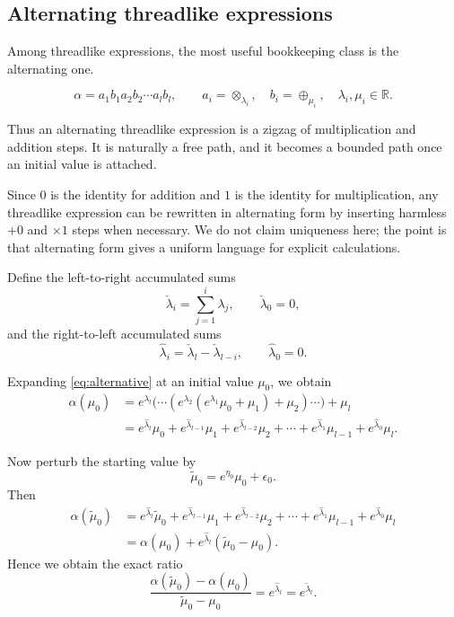 \subsection{Alternating threadlike expressions}\label{subsec:alternating}

Among threadlike expressions, the most useful bookkeeping class is the alternating one.

\begin{equation}\label{eq:alternative}
\alpha = a_1 b_1 a_2 b_2 \cdots a_l b_l,
\qquad
 a_i=\otimes_{\lambda_i},\quad b_i=\oplus_{\mu_i},\quad \lambda_i,\mu_i\in\mathbb{R}.
\end{equation}

Thus an alternating threadlike expression is a zigzag of multiplication and addition steps. It is naturally a free path, and it becomes a bounded path once an initial value is attached.

Since $0$ is the identity for addition and $1$ is the identity for multiplication, any threadlike expression can be rewritten in alternating form by inserting harmless $+0$ and $\times 1$ steps when necessary. We do not claim uniqueness here; the point is that alternating form gives a uniform language for explicit calculations.

Define the left-to-right accumulated sums
\begin{equation}
\check{\lambda}_i = \sum_{j=1}^i \lambda_j,
\qquad
\check{\lambda}_0=0,
\label{eq:accsumlr}
\end{equation}
and the right-to-left accumulated sums
\begin{equation}
\hat{\lambda}_i = \check{\lambda}_l - \check{\lambda}_{l-i},
\qquad
\hat{\lambda}_0=0.
\label{eq:accsumrl}
\end{equation}

Expanding \eqref{eq:alternative} at an initial value $\mu_0$, we obtain
\begin{align}
\alpha(\mu_0)
&= e^{\lambda_l}\bigl(\cdots(e^{\lambda_2}(e^{\lambda_1}\mu_0+\mu_1)+\mu_2)\cdots\bigr)+\mu_l \\
&= e^{\hat{\lambda}_l}\mu_0 + e^{\hat{\lambda}_{l-1}}\mu_1 + e^{\hat{\lambda}_{l-2}}\mu_2 + \cdots + e^{\hat{\lambda}_1}\mu_{l-1} + e^{\hat{\lambda}_0}\mu_l.
\end{align}

Now perturb the starting value by
\[
\tilde\mu_0=e^{\eta_0}\mu_0+\epsilon_0.
\]
Then
\begin{align}
\alpha(\tilde\mu_0)
&= e^{\hat{\lambda}_l}\tilde\mu_0 + e^{\hat{\lambda}_{l-1}}\mu_1 + e^{\hat{\lambda}_{l-2}}\mu_2 + \cdots + e^{\hat{\lambda}_1}\mu_{l-1} + e^{\hat{\lambda}_0}\mu_l \\
&= \alpha(\mu_0)+e^{\hat{\lambda}_l}(\tilde\mu_0-\mu_0).
\end{align}
Hence we obtain the exact ratio
\begin{equation}
\frac{\alpha(\tilde\mu_0)-\alpha(\mu_0)}{\tilde\mu_0-\mu_0}
= e^{\hat{\lambda}_l}
= e^{\check{\lambda}_l}.
\label{eq:ratio-alternating}
\end{equation}

